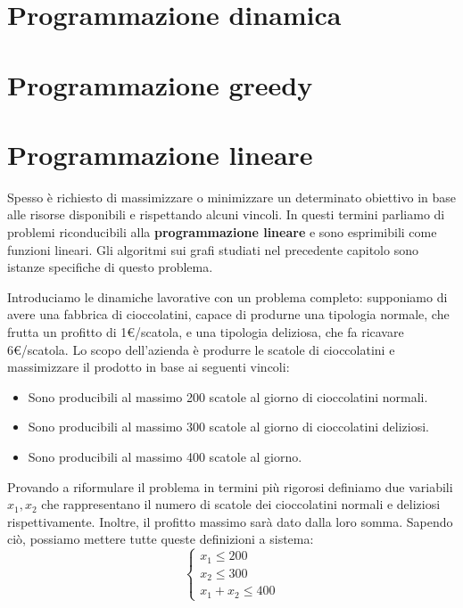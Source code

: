 \section{Programmazione dinamica}

%

\section{Programmazione greedy}

%

\section{Programmazione lineare}
Spesso è richiesto di massimizzare o minimizzare un determinato obiettivo in base alle risorse disponibili e rispettando alcuni vincoli. In questi
termini parliamo di problemi riconducibili alla \textbf{programmazione lineare} e sono esprimibili come funzioni lineari. Gli algoritmi sui grafi
studiati nel precedente capitolo sono istanze specifiche di questo problema.\par
Introduciamo le dinamiche lavorative con un problema completo: supponiamo di avere una fabbrica di cioccolatini, capace di produrne una tipologia
normale, che frutta un profitto di 1€/scatola, e una tipologia deliziosa, che fa ricavare 6€/scatola. Lo scopo dell'azienda è
produrre le scatole di cioccolatini e massimizzare il prodotto in base ai seguenti vincoli: \begin{itemize}
    \item Sono producibili al massimo 200 scatole al giorno di cioccolatini normali.
    \item Sono producibili al massimo 300 scatole al giorno di cioccolatini deliziosi.
    \item Sono producibili al massimo 400 scatole al giorno.
\end{itemize}

\noindent Provando a riformulare il problema in termini più rigorosi definiamo due variabili $x_1, x_2$ che rappresentano il numero di scatole dei
cioccolatini normali e deliziosi rispettivamente. Inoltre, il profitto massimo sarà dato dalla loro somma. Sapendo ciò, possiamo mettere tutte queste
definizioni a sistema: \[
    \begin{cases}
        x_1 \leq 200\\
        x_2 \leq 300\\
        x_1+x_2 \leq 400
    \end{cases}
\]

